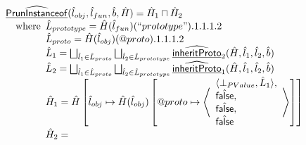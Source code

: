\[\begin{array}{ll}
& \widehat{\underline{\sf PrunInstanceof}} (\hat{l}_{obj}, \hat{l}_{fun}, \hat{b}, \hat{H}) = \hat{H}_1 \sqcap \hat{H}_2\\
& \quad{\rm where}\begin{array}[t]{l}
  \hat{L}_{prototype} = \hat{H}(\hat{l}_{fun})(``prototype").1.1.1.2\\
  \hat{L}_{proto} = \hat{H}(\hat{l}_{obj})(@proto).1.1.1.2\\
  \hat{L}_1 = 
      \bigsqcup_{\hat{l}_1 \in \hat{L}_{proto}} \bigsqcup_{\hat{l}_2 \in \hat{L}_{prototype}} \widehat{\underline{\sf inheritProto}}_2(\hat{H}, \hat{l}_1, \hat{l}_2, \hat{b})\\
  \hat{L}_2 = 
      \bigsqcup_{\hat{l}_1 \in \hat{L}_{proto}} \bigsqcup_{\hat{l}_2 \in \hat{L}_{prototype}} \widehat{\underline{\sf inheritProto}}_1(\hat{H}, \hat{l}_1, \hat{l}_2, \hat{b})\\
  \hat{H}_1 = 
      \hat{H} \left[ \hat{l}_{obj} \mapsto \hat{H}(\hat{l}_{obj}) \left[ @proto \mapsto 
        \left\langle 
        \begin{array}{l}
        \langle \bot_{PValue}, \hat{L}_1 \rangle,\\
        \hat{\mbox{\textsf{false}}},\\
        \hat{\mbox{\textsf{false}}},\\
        \hat{\mbox{\textsf{false}}}\\
        \end{array}
        \right\rangle      
      \right]\right]\\
  \hat{H}_2 = 
\end{array}
\end{array}\]
